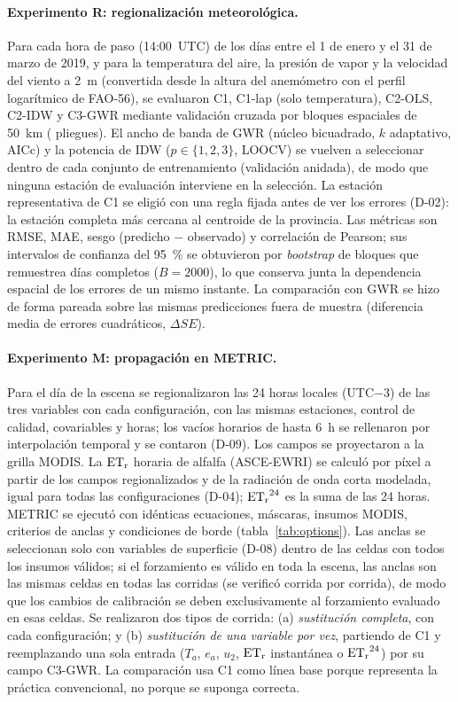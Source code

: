 \paragraph{Experimento R: regionalización meteorológica.} Para cada hora
de paso (14:00~UTC) de los \NCVDays{} días entre el 1 de enero y el 31 de
marzo de 2019, y para la temperatura del aire, la presión de vapor y la
velocidad del viento a \SI{2}{\metre} (convertida desde la altura del
anemómetro con el perfil logarítmico de FAO-56), se evaluaron C1, C1-lap
(solo temperatura), C2-OLS, C2-IDW y C3-GWR mediante validación cruzada por
bloques espaciales de \SI{50}{\kilo\metre} (\NFolds{} pliegues). El ancho de
banda de GWR (núcleo bicuadrado, $k$ adaptativo, AICc) y la potencia de IDW
($p\in\{1,2,3\}$, LOOCV) se vuelven a seleccionar dentro de cada conjunto de
entrenamiento (validación anidada), de modo que ninguna estación de
evaluación interviene en la selección. La estación representativa de C1 se
eligió con una regla fijada antes de ver los errores (D-02): la estación
completa más cercana al centroide de la provincia. Las métricas son RMSE,
MAE, sesgo (predicho $-$ observado) y correlación de Pearson; sus intervalos
de confianza del 95~\% se obtuvieron por \emph{bootstrap} de bloques que
remuestrea días completos ($B=2000$), lo que conserva junta la dependencia
espacial de los errores de un mismo instante. La comparación con GWR se
hizo de forma pareada sobre las mismas predicciones fuera de muestra
(diferencia media de errores cuadráticos, $\Delta SE$).

\paragraph{Experimento M: propagación en METRIC.} Para el día de la escena
se regionalizaron las 24 horas locales (UTC$-3$) de las tres variables con
cada configuración, con las mismas estaciones, control de calidad,
covariables y horas; los vacíos horarios de hasta 6~h se rellenaron por
interpolación temporal y se contaron (D-09). Los campos se proyectaron a la
grilla MODIS. La $\mathrm{ET_r}$ horaria de alfalfa (ASCE-EWRI) se calculó por píxel
a partir de los campos regionalizados y de la radiación de onda corta
modelada, igual para todas las configuraciones (D-04); $\mathrm{ET_r}^{24}$ es la
suma de las 24 horas. METRIC se ejecutó con idénticas ecuaciones, máscaras,
insumos MODIS, criterios de anclas y condiciones de borde
(tabla~\ref{tab:options}). Las anclas se seleccionan solo con variables de
superficie (D-08) dentro de las celdas con todos los insumos válidos; si
el forzamiento es válido en toda la escena, las anclas son las mismas celdas
en todas las corridas (se verificó corrida por corrida), de modo que los
cambios de calibración se deben exclusivamente al forzamiento evaluado en
esas celdas. Se realizaron
dos tipos de corrida: (a) \emph{sustitución completa}, con cada
configuración; y (b) \emph{sustitución de una variable por vez}, partiendo de
C1 y reemplazando una sola entrada ($T_a$, $e_a$, $u_2$, $\mathrm{ET_r}$ instantánea
o $\mathrm{ET_r}^{24}$) por su campo C3-GWR. La comparación usa C1 como línea base
porque representa la práctica convencional, no porque se suponga correcta.


